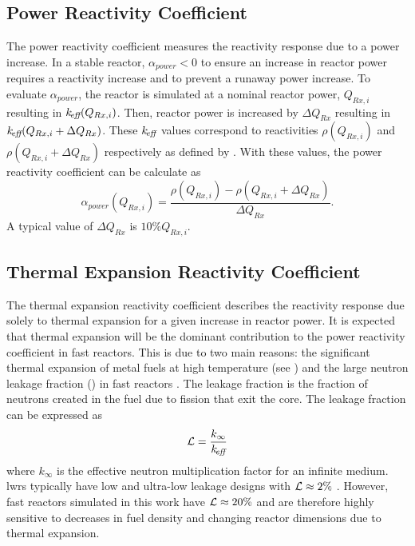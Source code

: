   \subsection{Power Reactivity Coefficient}
  \label{sec:power_reactivity_coefficient}
    The power reactivity coefficient measures the reactivity response due to a
    power increase. In a stable reactor, $\alpha_{power} < 0$ to ensure an
    increase in reactor power requires a reactivity increase and to prevent a
    runaway power increase. To evaluate $\alpha_{power}$, the reactor is
    simulated at a nominal reactor power, $Q_{Rx,i}$ resulting in
    $k_{\!\mbox{\scriptsize \em eff}}(Q_{Rx,i})$. Then, reactor power is increased by $\Delta Q_{Rx}$
    resulting in $k_{\!\mbox{\scriptsize \em eff}}(Q_{Rx,i} + \Delta Q_{Rx})$. These $k_{\!\mbox{\scriptsize \em eff}}$ values
    correspond to reactivities $\rho(Q_{Rx,i})$ and ${\rho(Q_{Rx,i} + \Delta
    Q_{Rx})}$ respectively as defined by . With these
    values, the power reactivity coefficient can be calculate as
    \begin{equation}
      \label{eq:power_reactivity_coefficient}
      \alpha_{power}(Q_{Rx,i}) = \frac{\rho(Q_{Rx,i}) - \rho(Q_{Rx,i} + 
        \Delta Q_{Rx})} {\Delta Q_{Rx}}.
    \end{equation}
    A typical value of $\Delta Q_{Rx}$ is $10\% Q_{Rx,i}$.

  \subsection{Thermal Expansion Reactivity Coefficient}
  \label{sec:thermal_expansion_reactivity_coefficent}
    The thermal expansion reactivity coefficient describes the reactivity 
    response due solely to thermal expansion for a given increase in reactor 
    power. It is expected that thermal expansion will be the dominant 
    contribution to the power reactivity coefficient in fast reactors. This is 
    due to two main reasons: the significant thermal expansion of metal fuels at
    high temperature (see ) and the large neutron
    leakage fraction (\leakage) in fast reactors \cite{PlentifulEnergy}. The
    leakage fraction is the fraction of neutrons created in the fuel due to
    fission that exit the core. The leakage fraction can be expressed as
    \begin{equation}
      \label{eq:leakage}
      \mathcal{L} = \frac{k_{\infty}}{k_{\!\mbox{\scriptsize \em eff}}}
    \end{equation}
    where $k_{\infty}$ is the effective neutron multiplication factor for an
    infinite medium. \glspl{lwr} typically have low and ultra-low leakage
    designs with $\mathcal{L} \approx 2 \%$ \cite{textbookknief}. However, fast
    reactors simulated in this work have $\mathcal{L} \approx 20\%$ and are
    therefore highly sensitive to decreases in fuel density and changing reactor
    dimensions due to thermal expansion.

